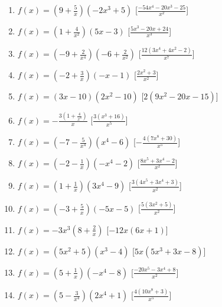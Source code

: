 \begin{enumerate}
\begin{enumerate}
\item \(f(x)=\left(9 + \frac{5}{x}\right) \left(- 2 x^{3} + 5\right)\)
  \hfill [\(\frac{- 54 x^{4} - 20 x^{3} - 25}{x^{2}}\)]
\item \(f(x)=\left(1 + \frac{4}{x^{2}}\right) \left(5 x - 3\right)\)
  \hfill [\(\frac{5 x^{3} - 20 x + 24}{x^{3}}\)]
\item \(f(x)=\left(-9 + \frac{2}{x^{4}}\right) \left(-6 + 
\frac{2}{x^{2}}\right)\)
  \hfill [\(\frac{12 \left(3 x^{4} + 4 x^{2} - 2\right)}{x^{7}}\)]
\item \(f(x)=\left(-2 + \frac{3}{x}\right) \left(- x - 1\right)\)
  \hfill [\(\frac{2 x^{2} + 3}{x^{2}}\)]
\item \(f(x)=\left(3 x - 10\right) \left(2 x^{2} - 10\right)\)
  \hfill [\(2 \left(9 x^{2} - 20 x - 15\right)\)]
\item \(f(x)=- \frac{3 \left(1 + \frac{4}{x^{3}}\right)}{x}\)
  \hfill [\(\frac{3 \left(x^{3} + 16\right)}{x^{5}}\)]
\item \(f(x)=\left(-7 - \frac{5}{x^{4}}\right) \left(x^{4} - 6\right)\)
  \hfill [\(- \frac{4 \left(7 x^{8} + 30\right)}{x^{5}}\)]
\item \(f(x)=\left(-2 - \frac{1}{x}\right) \left(- x^{4} - 2\right)\)
  \hfill [\(\frac{8 x^{5} + 3 x^{4} - 2}{x^{2}}\)]
\item \(f(x)=\left(1 + \frac{1}{x}\right) \left(3 x^{4} - 9\right)\)
  \hfill [\(\frac{3 \left(4 x^{5} + 3 x^{4} + 3\right)}{x^{2}}\)]
\item \(f(x)=\left(-3 + \frac{5}{x}\right) \left(- 5 x - 5\right)\)
  \hfill [\(\frac{5 \left(3 x^{2} + 5\right)}{x^{2}}\)]
\item \(f(x)=- 3 x^{3} \left(8 + \frac{2}{x}\right)\)
  \hfill [\(- 12 x \left(6 x + 1\right)\)]
\item \(f(x)=\left(5 x^{2} + 5\right) \left(x^{3} - 4\right)\)
  \hfill [\(5 x \left(5 x^{3} + 3 x - 8\right)\)]
\item \(f(x)=\left(5 + \frac{1}{x}\right) \left(- x^{4} - 8\right)\)
  \hfill [\(\frac{- 20 x^{5} - 3 x^{4} + 8}{x^{2}}\)]
\item \(f(x)=\left(5 - \frac{3}{x^{4}}\right) \left(2 x^{4} + 1\right)\)
  \hfill [\(\frac{4 \left(10 x^{8} + 3\right)}{x^{5}}\)]



\end{enumerate}
\end{enumerate}
